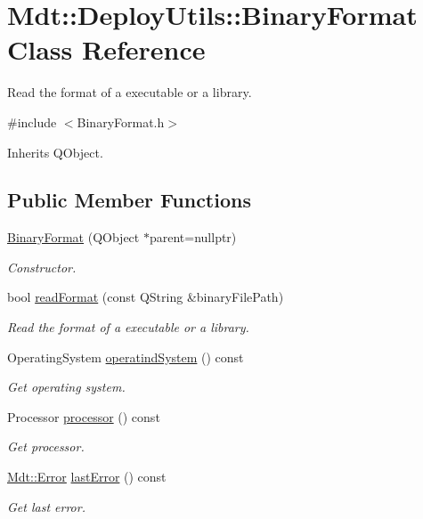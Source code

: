 \hypertarget{class_mdt_1_1_deploy_utils_1_1_binary_format}{}\section{Mdt\+:\+:Deploy\+Utils\+:\+:Binary\+Format Class Reference}
\label{class_mdt_1_1_deploy_utils_1_1_binary_format}


Read the format of a executable or a library.  




{\ttfamily \#include $<$Binary\+Format.\+h$>$}



Inherits Q\+Object.

\subsection*{Public Member Functions}
\begin{DoxyCompactItemize}
\item 
\hyperlink{class_mdt_1_1_deploy_utils_1_1_binary_format_afc8824fd9d24d38d37dc11d9845d6d6c}{Binary\+Format} (Q\+Object $\ast$parent=nullptr)
\begin{DoxyCompactList}\small\item\em Constructor. \end{DoxyCompactList}\item 
bool \hyperlink{class_mdt_1_1_deploy_utils_1_1_binary_format_a9a0d738562a41af21b81d12199b62ea4}{read\+Format} (const Q\+String \&binary\+File\+Path)
\begin{DoxyCompactList}\small\item\em Read the format of a executable or a library. \end{DoxyCompactList}\item 
Operating\+System \hyperlink{class_mdt_1_1_deploy_utils_1_1_binary_format_ae2dacfb9fcbca3950f42db853d38ed28}{operatind\+System} () const 
\begin{DoxyCompactList}\small\item\em Get operating system. \end{DoxyCompactList}\item 
Processor \hyperlink{class_mdt_1_1_deploy_utils_1_1_binary_format_a6ef69355fc5185e203e2952ebeafc62e}{processor} () const 
\begin{DoxyCompactList}\small\item\em Get processor. \end{DoxyCompactList}\item 
\hyperlink{class_mdt_1_1_error}{Mdt\+::\+Error} \hyperlink{class_mdt_1_1_deploy_utils_1_1_binary_format_a66bc1c286aa55a5634fcb89669d53496}{last\+Error} () const 
\begin{DoxyCompactList}\small\item\em Get last error. \end{DoxyCompactList}\end{DoxyCompactItemize}


